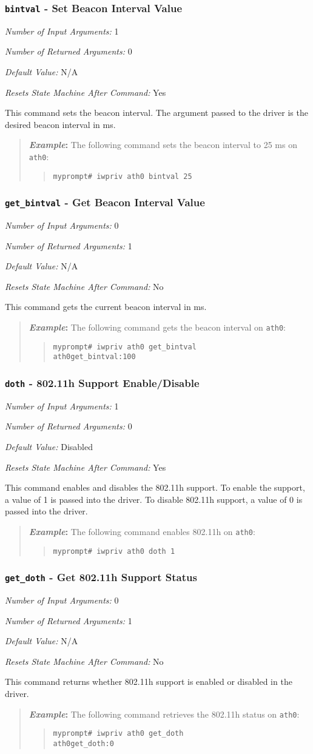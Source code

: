 \documentclass[10pt,fullpage]{article}
\newcommand{\mytt}[1]{{\texttt{#1}}}
\newcommand{\bv}{\begin{verse}}
\newcommand{\ev}{\end{verse}}
\newcommand{\cmd}[1]{{\texttt{myprompt\# #1}}}
\newcommand{\argdesc}[4]{\begin{description}
\itemsep -6pt
\item \textit{Number of Input Arguments:} #1
\item \textit{Number of Returned Arguments:} #2
\item \textit{Default Value:} #3
\item \textit{Resets State Machine After Command:} #4
\end{description}
}
\newenvironment{example}{\begin{quote}\textbf{\textit{Example}:}}{\end{quote}}
\begin{document}
\subsubsection{\mytt{bintval} - Set Beacon Interval Value}
\argdesc{1}{0}{N/A}{Yes}
This command sets the beacon interval.  The argument passed to the
driver is the desired beacon interval in ms.
\begin{example}
  The following command sets the beacon interval to 25 ms on
  \mytt{ath0}:
  \bv
  \cmd{iwpriv ath0 bintval 25}
  \ev
\end{example}

\subsubsection{\mytt{get\_bintval} - Get Beacon Interval Value}
\argdesc{0}{1}{N/A}{No}
This command gets the current beacon interval in ms.
\begin{example}
  The following command gets the beacon interval on \mytt{ath0}:
  \bv
  \cmd{iwpriv ath0 get\_bintval}\\
  \mytt{ath0\hspace{32pt}get\_bintval:100}
  \ev
\end{example}

\subsubsection{\mytt{doth} - 802.11h Support Enable/Disable}
\argdesc{1}{0}{Disabled}{Yes}
This command enables and disables the 802.11h support.  To enable the
support, a value of 1 is passed into the driver. To disable 802.11h
support, a value of 0 is passed into the driver.
\begin{example}
  The following command enables 802.11h on \mytt{ath0}:
  \bv
  \cmd{iwpriv ath0 doth 1}
  \ev
\end{example}

\subsubsection{\mytt{get\_doth} - Get 802.11h Support Status}
\argdesc{0}{1}{N/A}{No}
This command returns whether 802.11h support is enabled or disabled in
the driver.
\begin{example}
  The following command retrieves the 802.11h status on \mytt{ath0}:
  \bv
  \cmd{iwpriv ath0 get\_doth}\\
  \mytt{ath0\hspace{32pt}get\_doth:0}
  \ev
\end{example}
\end{document}
